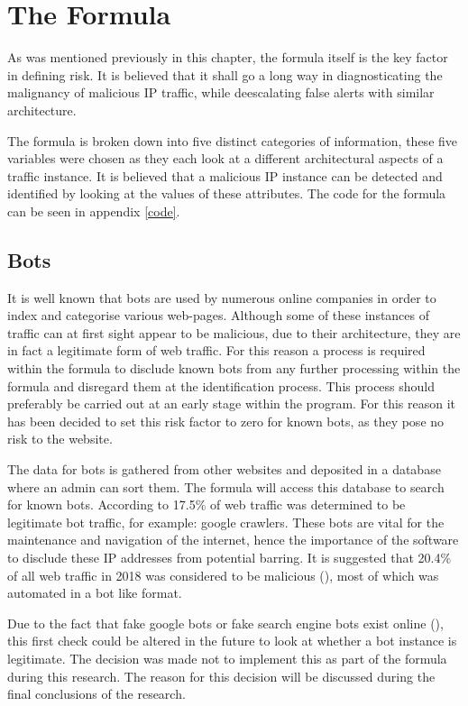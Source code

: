 \section{The Formula} \label{The Formula}

As was mentioned previously in this chapter, the formula itself is the key factor in defining risk. It is believed that it shall go a long way in diagnosticating the malignancy of malicious IP traffic, while deescalating false alerts with similar architecture.

The formula is broken down into five distinct categories of information, these five variables were chosen as they each look at a different architectural aspects of a traffic instance. It is believed that a malicious IP instance can be detected and identified by looking at the values of these attributes. The code for the formula can be seen in appendix \ref{code}.

\subsection{Bots}

It is well known that bots are used by numerous online companies in order to index and categorise various web-pages. Although some of these instances of traffic can at first sight appear to be malicious, due to their architecture, they are in fact a legitimate form of web traffic. For this reason a process is required within the formula to disclude known bots from any further processing within the formula and disregard them at the identification process. This process should preferably be carried out at an early stage within the program. For this reason it has been decided to set this risk factor to zero for known bots, as they pose no risk to the website.

The data for bots is gathered from other websites and deposited in a database where an admin can sort them. The formula will access this database to search for known bots. According to \citeauthor{Bots} 17.5\% of web traffic was determined to be legitimate bot traffic, for example: google crawlers. These bots are vital for the maintenance and navigation of the internet, hence the importance of the software to disclude these IP addresses from potential barring. It is suggested that 20.4\% of all web traffic in 2018 was considered to be malicious (\cite{Bots}), most of which was automated in a bot like format.

Due to the fact that fake google bots or fake search engine bots exist online (\cite{algiryage2018distinguishing}), this first check could be altered in the future to look at whether a bot instance is legitimate. The decision was made not to implement this as part of the formula during this research. The reason for this decision will be discussed during the final conclusions of the research.

